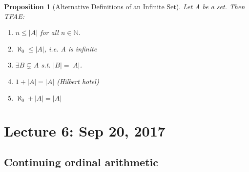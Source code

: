 \documentclass[11pt, oneside]{book}
\theoremstyle{break}
\newtheorem{propo}{Proposition}[section]
\newcommand{\bb}[1]{\mathbb{#1}}			%
\begin{document}
\begin{propo}[Alternative Definitions of an Infinite Set]
	Let A be a set. Then TFAE:
	\begin{enumerate}
		\item $n \leq |A|$ for all $n \in \bb{N}$.
		\item $\aleph_0 \leq |A|$, i.e. A is infinite
		\item $\exists B \subsetneq A$ s.t. $|B| = |A|$.
		\item $1 + |A| = |A|$ (Hilbert hotel)
		\item $\aleph_0 + |A| = |A|$
	\end{enumerate}
\end{propo}

\chapter{Lecture 6: Sep 20, 2017}\label{chp:lec6}

\section{Continuing ordinal arithmetic}\label{sect:ordinal_arith_cont}
\end{document}
